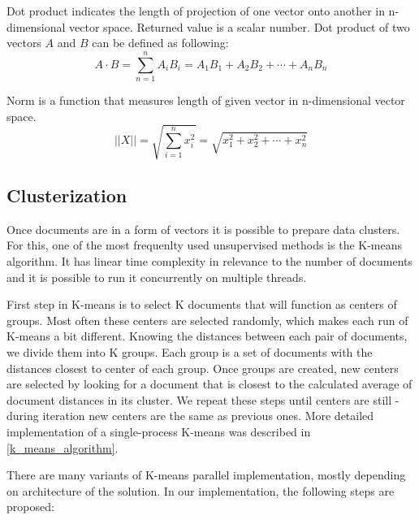  \begin{definition} \label{def_dot_product}
 	Dot product indicates the length of projection of one vector onto another in n-dimensional vector space. Returned value is a scalar number. Dot product of two vectors \(A\) and \(B\) can be defined as following:
 	\[A \cdot B = \sum_{n=1}^{n} A_i B_i = A_1 B_1 + A_2 B_2 + \cdots + A_n B_n \]
 \end{definition}
 
 \begin{definition} \label{def_euclidean_norm}
 	Norm is a function that measures length of given vector in n-dimensional vector space. 
 	\[ ||X|| = \sqrt{\sum_{i=1}^{n}x_i^2} = \sqrt{x_1^2 + x_2^2 + \cdots + x_n^2} \]
 \end{definition}

\subsection{Clusterization}
Once documents are in a form of vectors it is possible to prepare data clusters. For this, one of the most frequenlty used unsupervised methods is the K-means algorithm. It has linear time complexity in relevance to the number of documents and it is possible to run it concurrently on multiple threads. 

First step in K-means is to select K documents that will function as centers of groups. Most often these centers are selected randomly, which makes each run of K-means a bit different.
Knowing the distances between each pair of documents, we divide them into K groups. Each group is a set of documents with the distances closest to center of each group. Once groups are created, new centers are selected by looking for a document that is closest to the calculated average of document distances in its cluster. We repeat these steps until centers are still - during iteration new centers are the same as previous ones. 
More detailed implementation of a single-process K-means was described in \ref{k_means_algorithm}.

There are many variants of K-means parallel implementation, mostly depending on architecture of the solution. In our implementation, the following steps are proposed:

